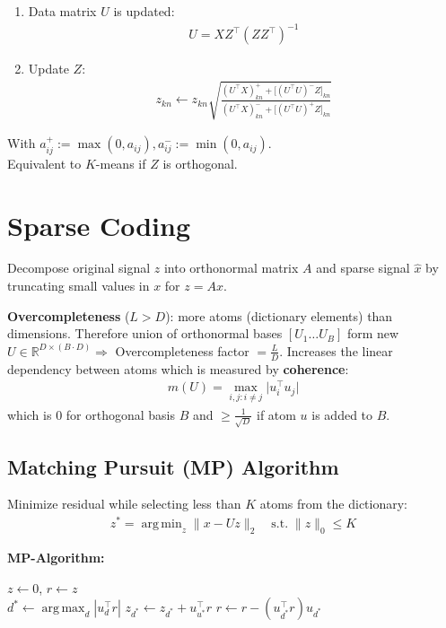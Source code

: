 \documentclass[a4paper,landscape,10pt]{article}
\newlength{\wideitemsep}
\let\olditem\item
\renewcommand{\item}{\setlength{\itemsep}{\wideitemsep}\olditem}
\newcommand{\R}[0]
{
    \mathbb{R}%
}
\DeclareMathOperator*{\argmin}{arg\,min}
\DeclareMathOperator*{\argmax}{arg\,max}
\begin{document}
\begin{multicols}{4}
\begin{enumerate}
    \item Data matrix $U$ is updated: 
    \begin{align*}
    U = XZ^\top (Z Z^\top)^{-1}
    \end{align*}
    \item Update $Z$:
    \begin{align*}
        z_{kn} \leftarrow z_{kn} \sqrt{
        \frac{
            (U^\top X)_{kn}^+ + \big[ (U^\top U)^- Z \big]_{kn}
        }{
            (U^\top X)_{kn}^- + \big[ (U^\top U)^+ Z \big]_{kn}
        }}
    \end{align*}
\end{enumerate}
With $a_{ij}^+ := \max(0, a_{ij}), a_{ij}^- := \min(0, a_{ij})$.\\
Equivalent to $K$-means if $Z$ is orthogonal.



\section{Sparse Coding}
Decompose original signal $z$ into orthonormal matrix $A$ and sparse signal
$\hat{x}$ by truncating small values in $x$ for $z = Ax$.

{\bf Overcompleteness} ($L > D$): more atoms (dictionary elements) than
dimensions. Therefore union of orthonormal bases $[U_1 \ldots U_B]$ form new $U
\in \R^{D \times (B\cdot D)} \Rightarrow$ Overcompleteness factor $=
\frac{L}{D}$. Increases the linear dependency between atoms which is measured by
{\bf coherence}:
\begin{align*}
    m(U) = \max_{i,j: i \neq j} \big| u_i^\top u_j \big|
\end{align*}
which is $0$ for orthogonal basis $B$ and $\geq \frac{1}{\sqrt{D}}$ if atom $u$
is added to $B$.

\subsection{Matching Pursuit (MP) Algorithm}
Minimize residual while selecting less than $K$ atoms from the dictionary:
\begin{align*}
    z^* = \argmin_z \| x - Uz \|_2 \quad \text{s.t.} \; \|z\|_0 \leq K
\end{align*}

{\bf MP-Algorithm:}
\begin{algorithmic}
\State $z\gets 0$, $r \gets z$
 \\
    \State $d^* \gets \argmax_d |u_d^\top r|$ 
    \State $z_{d^*} \gets z_{d^*} + u_{u^*}^\top r$
    \State $r \gets r - (u_{d^*}^\top r)u_{d^*}$
\EndWhile
\end{algorithmic}


\end{multicols}
\end{document}
